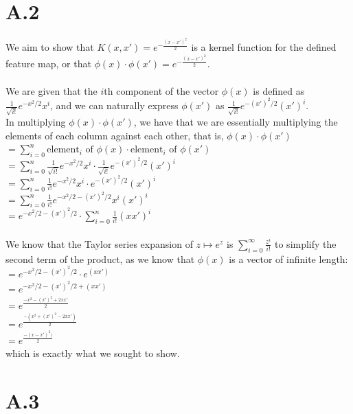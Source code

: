 \documentclass{article}
\newcommand{\1}{\mathbf{1}}
\begin{document}
\section*{A.2}
{\Large

We aim to show that $K(x, x') = e^{-\frac{(x-x')^2}{2}}$ is a kernel function for the defined feature map, or that $\phi (x) \cdot \phi (x') = e^{-\frac{(x-x')^2}{2}}$. \\ \\
We are given that the $i$th component of the vector $\phi(x)$ is defined as $\frac{1}{\sqrt{i!}} e^{-x^2/2} x^i$, and we can naturally express $\phi(x')$ as  $\frac{1}{\sqrt{i!}} e^{-(x')^2 / 2} (x')^i$.
\\
In multiplying $\phi(x) \cdot \phi(x')$, we have that we are essentially multiplying the elements of each column against each other, that is, $\phi(x) \cdot \phi(x')$ \\
$= \sum_{i=0}^{n} \text{element}_i \text{ of } \phi(x) \cdot \text{element}_i \text{ of } \phi(x')$ \\
$= \sum_{i=0}^{n} \frac{1}{\sqrt{i!}} e^{-x^2/2} x^i \cdot \frac{1}{\sqrt{i!}} e^{-(x')^2 / 2} (x')^i$ \\
$= \sum_{i=0}^{n} \frac{1}{i!} e^{-x^2/2} x^i \cdot e^{-(x')^2 / 2} (x')^i$ \\
$= \sum_{i=0}^{n} \frac{1}{i!} e^{-x^2/2 - (x')^2 / 2} x^i (x')^i$ \\
$= e^{-x^2/2 - (x')^2 / 2} \cdot \sum_{i=0}^{n} \frac{1}{i!} (xx')^i$ \\ \\
We know that the Taylor series expansion of $z \mapsto e^z$ is $\sum_{i=0}^{\infty} \frac{z^i}{i!}$ to simplify the second term of the product, as we know that $\phi(x)$ is a vector of infinite length: \\
$= e^{-x^2/2 - (x')^2 / 2} \cdot e^{(xx')}$ \\
$= e^{-x^2/2 - (x')^2 / 2 + (xx')} $ \\
$= e^{\frac{-x^2 - (x')^2 + 2xx'}{2}} $ \\
$= e^{\frac{-(x^2 + (x')^2 - 2xx')}{2}} $ \\
$= e^{\frac{-(x - x')^2)}{2}} $ \\
which is exactly what we sought to show.

}

\newpage
\section*{A.3}
\end{document}
